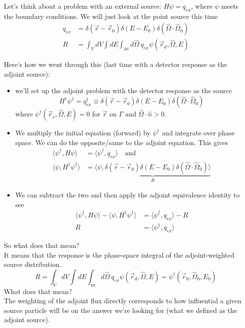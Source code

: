 \documentclass[12pt]{article}
\newcommand{\rvec}{\ensuremath{\vec{r}}}
\newcommand{\vOmega}{\ensuremath{\hat{\Omega}}}
\begin{document}
Let's think about a problem with an external source: $H \psi = q_{ex}$, where $\psi$ meets the boundary conditions. We will just look at the point source this time
%
\begin{align*}
q_{ex} &= \delta(\rvec - \rvec_0) \delta(E - E_0) \delta(\vOmega \cdot \vOmega_0) \\
R &= \int_V dV \int dE \int_{4\pi} d\vOmega\: q_{ex} \psi(\rvec_d, \vOmega, E)%
\end{align*}

Here's how we went through this (last time with a detector response as the adjoint source):
\begin{itemize}
\item we'll set up the adjoint problem with the detector response as the source
\[H^{\dagger}\psi^{\dagger} = q_{ex}^{\dagger} \equiv  \delta(\rvec - \rvec_0) \delta(E - E_0) \delta(\vOmega \cdot \vOmega_0)\]
where $\psi^{\dagger}(\vec{r}_s, \vOmega, E) = 0$ for $\rvec$ on $\Gamma$ and $\vOmega \cdot \hat{n} > 0$.
%
\item We multiply the initial equation (forward) by $\psi^{\dagger}$ and integrate over phase space. We can do the opposite/same to the adjoint equation. This gives
\begin{align*}
\langle\psi^{\dagger}, H\psi\rangle &= \langle\psi^{\dagger}, q_{ex}\rangle \quad \text{and}\\
\langle\psi, H^{\dagger} \psi^{\dagger}\rangle &= \underbrace{\langle\psi, \delta(\rvec - \rvec_0) \delta(E - E_0) \delta(\vOmega \cdot \vOmega_0)\rangle }_R
\end{align*}
%
\item We can subtract the two and then apply the adjoint equivalence identity to see
\begin{align*}
\langle\psi^{\dagger}, H\psi\rangle - \langle\psi, H^{\dagger} \psi^{\dagger}\rangle &= \langle\psi^{\dagger}, q_{ex}\rangle - R \\
R &= \langle\psi^{\dagger}, q_{ex}\rangle
\end{align*}
\end{itemize}
%
So what does that mean? \\
It means that the response is the phase-space integral of the adjoint-weighted source distribution. 
\[
R = \int_V dV \int dE \int_{4\pi} d\vOmega\: q_{ex} \psi(\rvec_d, \vOmega, E)=\psi^{\dagger}(\rvec_0, \vOmega_0, E_0)
\]
What does that mean? \\
The weighting of the adjoint flux directly corresponds to how influential a given source particle will be on the answer we're looking for (what we defined as the adjoint source).
\end{document}
